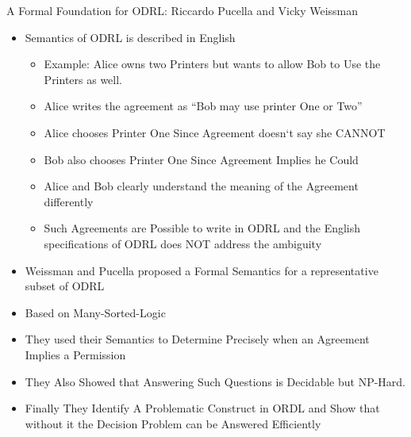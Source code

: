 \documentclass{beamer}
\begin{document}
\begin{frame}[fragile]{A Formal Foundation for ODRL: \newline Riccardo Pucella and Vicky Weissman}
\Large
\begin{itemize}
\item Semantics of ODRL is described in English
   \begin{itemize}
      \item Example: Alice owns two Printers but wants to allow Bob to Use the Printers as well. 
      \item Alice writes the agreement as ``Bob may use printer One or Two''
      \item Alice chooses Printer One Since Agreement doesn`t say she CANNOT
      \item Bob also chooses Printer One Since Agreement Implies he Could
      \item Alice and Bob clearly understand the meaning of the Agreement differently
      \item Such Agreements are Possible to write in ODRL and the English specifications of ODRL does NOT address the ambiguity
    \end{itemize}

\item Weissman and Pucella proposed a Formal Semantics for a representative subset of ODRL
\item Based on Many-Sorted-Logic
\item They used their Semantics to Determine Precisely when an Agreement Implies a Permission
\item They Also Showed that Answering Such Questions is Decidable but NP-Hard.
\item Finally They Identify A Problematic Construct in ORDL and Show that without it the Decision Problem can be Answered Efficiently

\end{itemize}
\end{frame}
\end{document}
